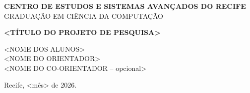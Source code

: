 \documentclass[12pt,a4paper]{article}
\begin{document}

\begin{titlepage}

\begin{center}

{\large \textbf{CENTRO DE ESTUDOS E SISTEMAS AVANÇADOS DO RECIFE}}\\[0.5cm]

{\large GRADUAÇÃO EM CIÊNCIA DA COMPUTAÇÃO}

\vspace{7cm}

{\Large \textbf{<TÍTULO DO PROJETO DE PESQUISA>}}

\vspace{7cm}

<NOME DOS ALUNOS>\\[0.2cm]
<NOME DO ORIENTADOR>\\[0.2cm]
<NOME DO CO-ORIENTADOR -- opcional>

\vspace{1.5cm}

Recife, <mês> de 2026.

\end{center}

\end{titlepage}



\newpage



\newpage



\newpage



\newpage



\newpage



\newpage

\end{document}
